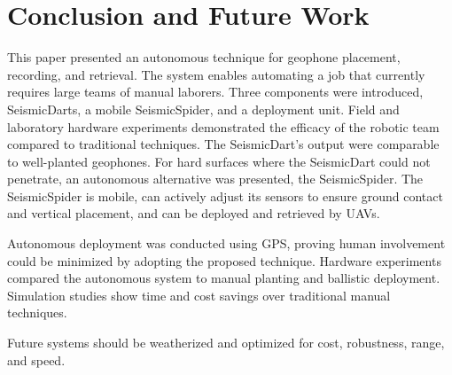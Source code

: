  \section{Conclusion and Future Work}\label{sec:Conclusion}
This paper presented an autonomous technique for geophone placement, recording, and retrieval. The system enables automating a job that currently requires large teams of manual laborers. Three components were introduced, SeismicDarts, a mobile SeismicSpider, and a deployment unit.
Field and laboratory hardware experiments demonstrated the efficacy of the robotic team compared to traditional techniques. 
The SeismicDart's output were comparable to well-planted geophones. 
For hard surfaces where the SeismicDart could not penetrate, an autonomous alternative was presented, the SeismicSpider.  
The SeismicSpider is mobile, can actively adjust its sensors to ensure ground contact and vertical placement, and can be deployed and retrieved by UAVs.

Autonomous deployment was conducted using GPS, proving human involvement could be minimized by adopting the proposed technique. 
Hardware experiments compared the autonomous system to manual planting and ballistic deployment.
Simulation studies show time and cost savings over traditional manual techniques.

Future systems should be weatherized and optimized for cost, robustness, range, and speed.

